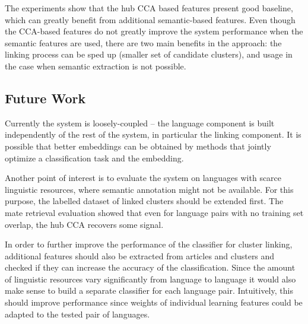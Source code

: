 \documentclass[twoside,11pt]{article}
\begin{document}
The experiments show that the hub CCA based features present good baseline, which can greatly benefit from additional semantic-based features. Even though the CCA-based features do not greatly improve the system performance when the semantic features are used, there are two main benefits in the approach: the linking process can be sped up (smaller set of candidate clusters), and usage in the case when semantic extraction is not possible.

\subsection{Future Work}

Currently the system is loosely-coupled -- the language component is built independently of the rest of the system, in particular the linking component. It is possible that better embeddings can be obtained by methods that jointly optimize a classification task and the embedding.
		
Another point of interest is to evaluate the system on languages with scarce linguistic resources, where semantic annotation might not be available. For this purpose, the labelled dataset of linked clusters should be extended first. The mate retrieval evaluation showed that even for language pairs with no training set overlap, the hub CCA recovers some signal.

In order to further improve the performance of the classifier for cluster linking, additional features should also be extracted from articles and clusters and checked if they can increase the accuracy of the classification. Since the amount of linguistic resources vary significantly from language to language it would also make sense to build a separate classifier for each language pair. Intuitively, this should improve performance since weights of individual learning features could be adapted to the tested pair of languages.


\vskip 0.2in


\end{document}
